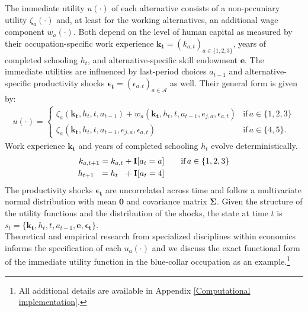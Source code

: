 \noindent The immediate utility $u(\cdot)$ of each alternative consists of a non-pecuniary utility $\zeta_a(\cdot)$ and, at least for the working alternatives, an additional wage component $w_a(\cdot)$. Both depend on the level of human capital as measured by their occupation-specific work experience $\bm{k_t} = \left(k_{a,t}\right)_{a\in\{1, 2, 3\}}$, years of completed schooling $h_t$, and alternative-specific skill endowment $\bm{e}$. The immediate utilities are influenced by last-period choices $a_{t -1}$ and alternative-specific productivity shocks $\bm{\epsilon_t} = \left(\epsilon_{a,t}\right)_{a\in\mathcal{A}}$ as well. Their general form is given by:
%
\begin{align*}
u(\cdot) =
\begin{cases}
    \zeta_a(\bm{k_t}, h_t, t, a_{t -1})  + w_a(\bm{k_t}, h_t, t, a_{t -1}, e_{j, a}, \epsilon_{a,t})                & \text{if}\, a \in \{1, 2, 3\}  \\
    \zeta_a(\bm{k_t}, h_t, t, a_{t-1}, e_{j,a}, \epsilon_{a,t})                                                  &  \text{if}\, a \in \{4, 5\}.
\end{cases}
\end{align*}
%
\noindent Work experience $\bm{k_t}$  and years of completed schooling $h_t$ evolve deterministically.
%
\begin{align*}
k_{a,t+1} = k_{a,t} + {\textbf{I}}[a_t = a]  &\qquad \text{if}\, a \in \{1, 2, 3\} \\
h_{t + 1\phantom{,a}} = h_{t\phantom{,a}} +   {\textbf{I}}[a_t = 4]  &\qquad
\end{align*}
%
\noindent The productivity shocks $\bm{\epsilon_t}$ are uncorrelated across time and follow a multivariate normal distribution with mean $\bm{0}$ and covariance matrix $\bm{\Sigma}$. Given the structure of the utility functions and the distribution of the shocks, the state at time $t$ is $s_t = \{\bm{k_t}, h_t, t, a_{t -1}, \bm{e},\bm{\epsilon_t}\}$.\\

\noindent Theoretical and empirical research from specialized disciplines within economics informs the specification of each $u_a(\cdot)$ and we discuss the exact functional form of the immediate utility function in the blue-collar occupation as an example.\footnote{All additional details are available in Appendix \ref{Computational implementation}.}\\

